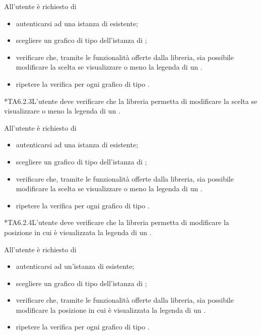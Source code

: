 		All'utente  è richiesto di
		\begin{itemize}
			\item autenticarsi ad una istanza di \projectname{} esistente;
			\item scegliere un grafico di tipo  dell'istanza di \projectname{};
			\item verificare che, tramite le funzionalità offerte dalla libreria, sia possibile modificare la scelta se visualizzare o meno la legenda di un .
			\item ripetere la verifica per ogni grafico di tipo .
		\end{itemize}

	*{TA6.2.3}L'utente  deve verificare che la libreria permetta di modificare la scelta se visualizzare o meno la legenda di un .
		
		All'utente  è richiesto di
		\begin{itemize}
			\item autenticarsi ad una istanza di \projectname{} esistente;
			\item scegliere un grafico di tipo  dell'istanza di \projectname{};
			\item verificare che, tramite le funzionalità offerte dalla libreria, sia possibile modificare la scelta se visualizzare o meno la legenda di un .
			\item ripetere la verifica per ogni grafico di tipo .
		\end{itemize}

	*{TA6.2.4}L'utente  deve verificare che la libreria permetta di modificare la posizione in cui è visualizzata la legenda di un .
		
		All'utente  è richiesto di
		\begin{itemize}
			\item autenticarsi ad un'istanza di \projectname{} esistente;
			\item scegliere un grafico di tipo  dell'istanza di \projectname{};
			\item verificare che, tramite le funzionalità offerte dalla libreria, sia possibile modificare la posizione in cui è visualizzata la legenda di un .
			\item ripetere la verifica per ogni grafico di tipo .
		\end{itemize}

